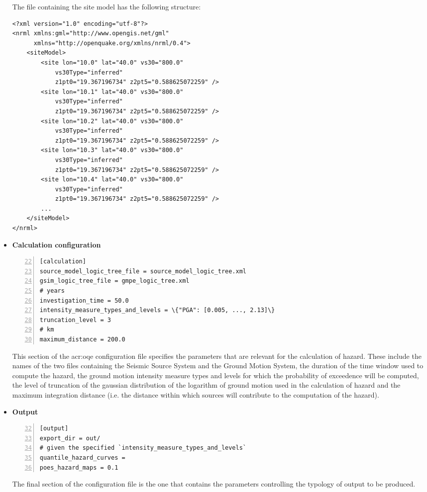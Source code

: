\begin{itemize}
\begin{Verbatim}[frame=single, commandchars=\\\{\}, fontsize=\small,
    firstnumber=17, numbers=left, numbersep=2pt]
\end{Verbatim}
The file containing the site model has the following 
structure:
\begin{Verbatim}[frame=single, commandchars=\\\{\}, fontsize=\small]
<?xml version="1.0" encoding="utf-8"?>
<nrml xmlns:gml="http://www.opengis.net/gml"
      xmlns="http://openquake.org/xmlns/nrml/0.4">
    <siteModel>
        <site lon="10.0" lat="40.0" vs30="800.0" 
            vs30Type="inferred" 
            z1pt0="19.367196734" z2pt5="0.588625072259" />
        <site lon="10.1" lat="40.0" vs30="800.0" 
            vs30Type="inferred" 
            z1pt0="19.367196734" z2pt5="0.588625072259" />
        <site lon="10.2" lat="40.0" vs30="800.0" 
            vs30Type="inferred" 
            z1pt0="19.367196734" z2pt5="0.588625072259" />
        <site lon="10.3" lat="40.0" vs30="800.0" 
            vs30Type="inferred" 
            z1pt0="19.367196734" z2pt5="0.588625072259" />
        <site lon="10.4" lat="40.0" vs30="800.0" 
            vs30Type="inferred" 
            z1pt0="19.367196734" z2pt5="0.588625072259" />
        ...
    </siteModel>
</nrml>
\end{Verbatim}

%
\item \textbf{Calculation configuration}
\label{sec:calculation_configuration}
\begin{Verbatim}[frame=single, commandchars=\\\{\}, fontsize=\small,
     firstnumber=22, numbers=left, numbersep=2pt]
[calculation]
source_model_logic_tree_file = source_model_logic_tree.xml
gsim_logic_tree_file = gmpe_logic_tree.xml
# years
investigation_time = 50.0
intensity_measure_types_and_levels = \{"PGA": [0.005, ..., 2.13]\} 
truncation_level = 3
# km
maximum_distance = 200.0
\end{Verbatim}
This section of the \gls{acr:oqe} configuration file specifies the 
parameters that
are relevant for the calculation of hazard. These include the names of
the two files containing the Seismic Source System and the Ground 
Motion System, the duration of the time window used to compute the 
hazard, the ground motion intensity measure types and levels for 
which the probability of exceedence will be computed, the level of
truncation of the gaussian 
distribution of the logarithm of ground motion used in the calculation 
of hazard and the maximum integration distance (i.e. the distance within 
which sources will contribute to the computation of the hazard).
%
\item \textbf{Output}
\begin{Verbatim}[frame=single, commandchars=\\\{\}, fontsize=\small,
    firstnumber=32, numbers=left, numbersep=2pt]
[output]
export_dir = out/
# given the specified `intensity_measure_types_and_levels`
quantile_hazard_curves =
poes_hazard_maps = 0.1
\end{Verbatim}
The final section of the configuration file is the one that contains 
the parameters controlling the typology of output to be produced.
%
\end{itemize}
%
%
%
